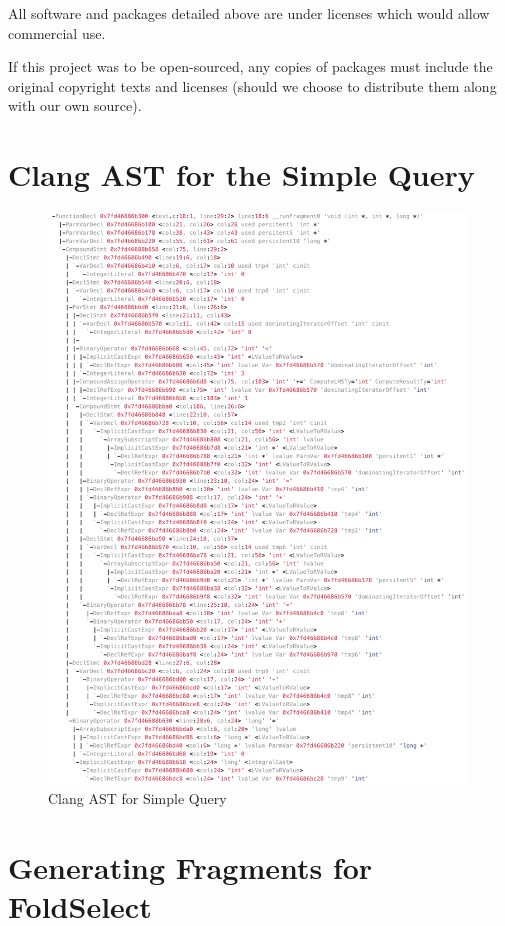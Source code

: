 All software and packages detailed above are under licenses which would allow commercial use.

If this project was to be open-sourced, any copies of packages must include the original copyright texts and licenses (should we choose to distribute them along with our own source).

\chapter{Clang AST for the Simple Query}

\begin{figure}[p]
\includegraphics[width=0.99\textwidth]{appendix/ClangAstSimpleQuery.png}
\centering
\caption{Clang AST for Simple Query}
\label{fig:clangast}
\end{figure}

\chapter{Generating Fragments for FoldSelect}

